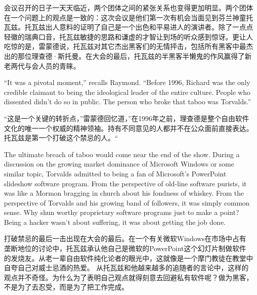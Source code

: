 \ifdefined\chs
会议召开的日子一天天临近，两个团体之间的紧张关系也变得更加明显。两个团体在一个问题上的观点是一致的：这次会议是他们第一次有机会当面见到芬兰神童托瓦兹。托瓦兹出人意料的证明了自己是一个出色和平易进人的演讲者。除了一点点轻徽的瑞典口音，托瓦兹敏捷的思路和谦虚的才智让到场的听众感到惊讶。更让人吃惊的是，雷蒙德说，托瓦兹对其它杰出黑客们的无情抨击，包括所有黑客中最杰出的那位理查德·斯托曼。在大会的最后，托瓦兹的半黑客半懒鬼的作风赢得了新老两代与会人员的青睐。
\fi

\ifdefined\eng
``It was a pivotal moment,'' recalls Raymond. ``Before 1996, Richard was the only credible claimant to being the ideological leader of the entire culture. People who dissented didn't do so in public. The person who broke that taboo was Torvalds.''
\fi

\ifdefined\chs
``这是一个关键的转折点，''雷蒙德回忆道，''在1996年之前，理查德是整个自由软件文化的唯一一个权威的精神领袖。持有不同意见的人都并不在公众面前直接表达。托瓦兹是第一个打破这个禁忌的人。``
\fi

\ifdefined\eng
The ultimate breach of taboo would come near the end of the show. During a discussion on the growing market dominance of Microsoft Windows or some similar topic, Torvalds admitted to being a fan of Microsoft's PowerPoint slideshow software program. From the perspective of old-line software purists, it was like a Mormon bragging in church about his fondness of whiskey. From the perspective of Torvalds and his growing band of followers, it was simply common sense. Why shun worthy proprietary software programs just to make a point? Being a hacker wasn't about suffering, it was about getting the job done.
\fi

\ifdefined\chs
打破禁忌的最后一击出现在大会的最后。在一个有关微软Windows在市场中占有垄断地位的讨论中，托瓦兹承认他自己是微软的PowerPoint这个幻灯片制做软件的发烧友。从老一辈自由软件纯化论者的眼光中，这就像是一个摩门教徒在教堂中自夸自己对威士忌酒的热爱。 从托瓦兹和他越来越多的追随者的言论中，这样的观点并不奇怪。为什么为了表明自己观点就得刻意去回避私有软件呢？做为黑客，不是为了去忍受，而是为了把工作完成。
\fi

